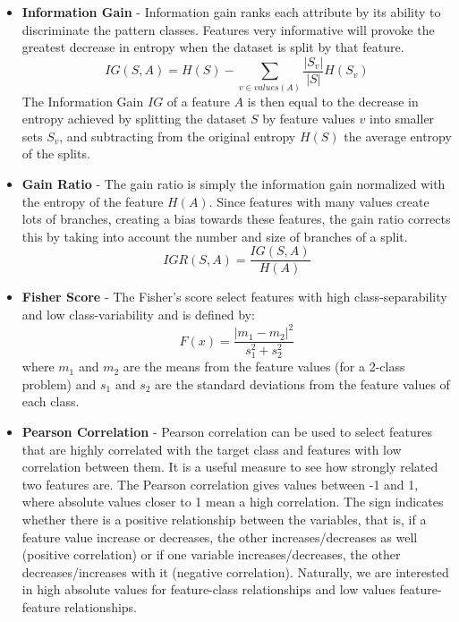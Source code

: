 \begin{itemize}
	\item \textbf{Information Gain} - Information gain ranks each attribute by its ability to discriminate the pattern classes. Features very informative will provoke the greatest decrease in entropy when the dataset is split by that feature.  
    \[IG(S,A) = H(S) - \sum_{v\in values(A)} \frac{\left | S_v \right |}{\left | S \right |}H(S_v)\]
    The Information Gain $IG$ of a feature $A$ is then equal to the decrease in entropy achieved by splitting the dataset $S$ by feature values $v$ into smaller sets $S_v$, and subtracting from the original entropy $H(S)$ the average entropy of the splits. 
    \item \textbf{Gain Ratio} - The gain ratio is simply the information gain normalized with the entropy of the feature $H(A)$. Since features with many values create lots of branches, creating a bias towards these features, the gain ratio corrects this by taking into account the number and size of branches of a split.
    \[IGR(S,A) = \frac{IG(S,A)}{H(A)}\]
    \item \textbf{Fisher Score} - The Fisher's score select features with high class-separability and low class-variability and is defined by: 
    \[F(x) = \frac{\left | m_1-m_2 \right |^2}{s_1^2+s_2^2}\]
    where $m_1$ and $m_2$ are the means from the feature values (for a 2-class problem) and $s_1$ and $s_2$ are the standard deviations from the feature values of each class.
    \item \textbf{Pearson Correlation} - Pearson correlation can be used to select features that are highly correlated with the target class and features with low correlation between them.  It is a useful measure to see how strongly related two features are. The Pearson correlation gives values between -1 and 1, where absolute values closer to 1 mean a high correlation. The sign indicates whether there is a positive relationship between the variables, that is, if a feature value increase or decreases, the other increases/decreases as well (positive correlation) or if one variable increases/decreases, the other decreases/increases with it (negative correlation). Naturally, we are interested in high absolute values for feature-class relationships and low values feature-feature relationships.  
       

\end{itemize}
